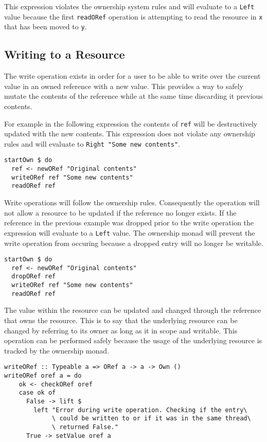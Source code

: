 \documentclass[onehalf,11pt]{beavtex}
\begin{document}
This expression violates the ownership system rules and will evaluate to
a \texttt{Left} value because the first \texttt{readORef} operation is
attempting to read the resource in \texttt{x} that has been moved to \texttt{y}.


\subsection{Writing to a Resource}

The write operation exists in order for a user to be able to write over the
current value in an owned reference with a new value. This provides a way to
safely mutate the contents of the reference while at the same time discarding
it previous contents.

For example in the following expression the contents of \texttt{ref}
will be destructively updated with the new contents. This expression does
not violate any ownership rules and will evaluate
to \texttt{Right "Some new contents"}. 

\begin{lstlisting}
startOwn $ do
  ref <- newORef "Original contents"
  writeORef ref "Some new contents"
  readORef ref
\end{lstlisting}

Write operations will follow the ownership rules. Consequently the operation
will not allow a resource to be updated if the reference no longer exists.
If the reference in the previous example was dropped prior to the
write operation the expression will evaluate to a \texttt{Left} value.
The ownership monad will prevent the write operation from occuring because
a dropped entry will no longer be writable.

\begin{lstlisting}
startOwn $ do
  ref <- newORef "Original contents"
  dropORef ref
  writeORef ref "Some new contents"
  readORef ref
\end{lstlisting}

The value within the resource can be updated and changed through the reference
that owns the resource.
This is to say that the underlying resource can be changed by referring to its
owner as long as it in scope and writable.
This operation can be performed safely because the usage
of the underlying resource is tracked by the ownership monad.

\begin{verbatim}
writeORef :: Typeable a => ORef a -> a -> Own ()
writeORef oref a = do
    ok <- checkORef oref
    case ok of
      False -> lift $
        left "Error during write operation. Checking if the entry\
             \ could be written to or if it was in the same thread\
             \ returned False."
      True -> setValue oref a
\end{verbatim}
\end{document}

